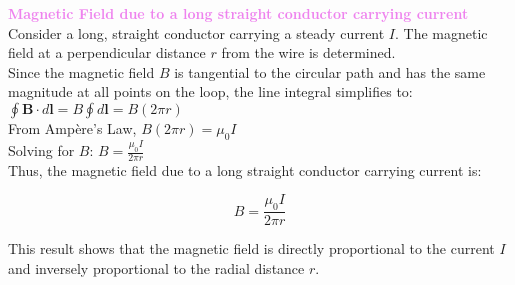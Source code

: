 \documentclass{beamer}
\begin{document}
\begin{frame}

\textcolor{violet}{\textbf{Magnetic Field due to a long straight conductor carrying current}}\\
Consider a long, straight conductor carrying a steady current \( I \). The magnetic field at a perpendicular distance \( r \) from the wire is determined.\\

Since the magnetic field \( B \) is tangential to the circular path and has the same magnitude at all points on the loop, the line integral simplifies to:\\


$\oint \mathbf{B} \cdot d\mathbf{l} = B \oint d\mathbf{l} = B (2\pi r)$\\

From Ampère’s Law, \hspace{1cm} $B (2\pi r) = \mu_0 I$\\

Solving for \( B \): \hspace{1cm} $B = \frac{\mu_0 I}{2\pi r}$\\
Thus, the magnetic field due to a long straight conductor carrying current is:

\[
B = \frac{\mu_0 I}{2\pi r}
\]

This result shows that the magnetic field is directly proportional to the current \( I \) and inversely proportional to the radial distance \( r \). 


\end{frame} 
 
\end{document}
